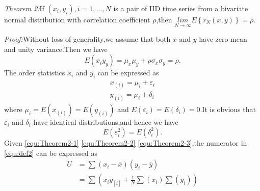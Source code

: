 \documentclass[journal]{IEEEtran}
\begin{document}
    \emph{Theorem 2:}If $(x_{i},y_{i}),i=1,\dots ,N$ is a pair of IID time series from a bivariate normal distribution with correlation coefficient $\rho $,then $\underset{N\rightarrow \infty }{lim}E\left \{ r_{N}(x,y) \right \}=\rho $.

    \emph{Proof:}Without loss of generality,we assume that both $x$ and $y$ have zero mean and unity variance.Then we have
    \begin{equation}\label{equ:Theorem2-1}
      E(x_{i}y_{y})=\mu _{x}\mu _{y}+\rho \sigma _{x}\sigma _{y}=\rho .
    \end{equation}
    The order statistics $x_{i}$ and $y_{i}$ can be expressed as
    \begin{equation}\label{equ:Theorem2-2}
      \begin{split}
        x_{(i)}=\mu _{i}+\varepsilon _{i}\\
        y_{(i)}=\mu _{i}+\delta _{i}
      \end{split}
    \end{equation}
    where $\mu _{i}=E(x_{(i)})=E(y_{(i)})$ and $E(\varepsilon _{i})=E(\delta _{i})=0$.It is obvious that $\varepsilon _{i}$ and $\delta _{i}$ have identical distributions,and hence we have
    \begin{equation}\label{equ:Theorem2-3}
        E(\varepsilon _{i}^{2})=E(\delta _{i}^{2}).
    \end{equation}
    Given \eqref{equ:Theorem2-1} \eqref{equ:Theorem2-2} \eqref{equ:Theorem2-3},the numerator in \eqref{equ:def2} can be expressed as
    \begin{equation}\label{equ:Theorem2-4}
      \begin{split}
         U&=\sum(x_{i}-\bar{x})(y_{i}-\bar{y}) \\
          &=\sum(x_{i}y_[i]+\frac{1}{N}\sum(x_{i})\sum(y_{i}))
      \end{split}
    \end{equation}

\hskip 5pt
\end{document}
